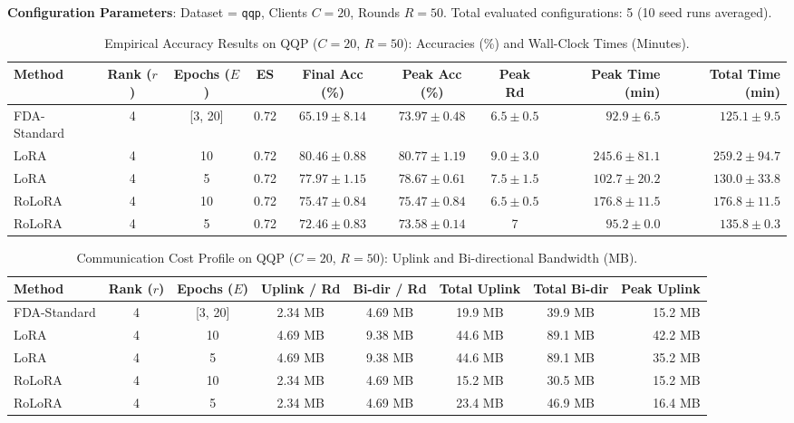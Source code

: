 \documentclass[10pt,a4paper]{article}
\begin{document}
\textbf{Configuration Parameters}: Dataset = \texttt{qqp}, Clients $C = 20$, Rounds $R = 50$. Total evaluated configurations: 5 (10 seed runs averaged).

\begin{table}[H]
\centering
\caption{Empirical Accuracy Results on QQP ($C=20$, $R=50$): Accuracies (\%) and Wall-Clock Times (Minutes).}
\scriptsize
\setlength{\tabcolsep}{3.5pt}
\begin{tabular*}{\textwidth}{@{\extracolsep{\fill}}lccccccrr@{}}
\toprule
\textbf{Method} & \textbf{Rank ($r$)} & \textbf{Epochs ($E$)} & \textbf{ES} & \textbf{Final Acc (\%)} & \textbf{Peak Acc (\%)} & \textbf{Peak Rd} & \textbf{Peak Time (min)} & \textbf{Total Time (min)} \\
\midrule
FDA-Standard & 4 & [3, 20] & 0.72 & $65.19 \pm 8.14$ & $73.97 \pm 0.48$ & $6.5 \pm 0.5$ & $\mathbf{92.9 \pm 6.5}$ & $\mathbf{125.1 \pm 9.5}$ \\
LoRA & 4 & 10 & 0.72 & $\mathbf{80.46 \pm 0.88}$ & $\mathbf{80.77 \pm 1.19}$ & $9.0 \pm 3.0$ & $245.6 \pm 81.1$ & $259.2 \pm 94.7$ \\
LoRA & 4 & 5 & 0.72 & $77.97 \pm 1.15$ & $78.67 \pm 0.61$ & $7.5 \pm 1.5$ & $102.7 \pm 20.2$ & $130.0 \pm 33.8$ \\
RoLoRA & 4 & 10 & 0.72 & $75.47 \pm 0.84$ & $75.47 \pm 0.84$ & $6.5 \pm 0.5$ & $176.8 \pm 11.5$ & $176.8 \pm 11.5$ \\
RoLoRA & 4 & 5 & 0.72 & $72.46 \pm 0.83$ & $73.58 \pm 0.14$ & 7 & $95.2 \pm 0.0$ & $135.8 \pm 0.3$ \\
\bottomrule
\end{tabular*}
\end{table}

\begin{table}[H]
\centering
\caption{Communication Cost Profile on QQP ($C=20$, $R=50$): Uplink and Bi-directional Bandwidth (MB).}
\scriptsize
\setlength{\tabcolsep}{4.0pt}
\begin{tabular*}{\textwidth}{@{\extracolsep{\fill}}lccccccr@{}}
\toprule
\textbf{Method} & \textbf{Rank ($r$)} & \textbf{Epochs ($E$)} & \textbf{Uplink / Rd} & \textbf{Bi-dir / Rd} & \textbf{Total Uplink} & \textbf{Total Bi-dir} & \textbf{Peak Uplink} \\
\midrule
FDA-Standard & 4 & [3, 20] & 2.34 MB & 4.69 MB & 19.9 MB & 39.9 MB & 15.2 MB \\
LoRA & 4 & 10 & 4.69 MB & 9.38 MB & 44.6 MB & 89.1 MB & 42.2 MB \\
LoRA & 4 & 5 & 4.69 MB & 9.38 MB & 44.6 MB & 89.1 MB & 35.2 MB \\
RoLoRA & 4 & 10 & 2.34 MB & 4.69 MB & 15.2 MB & 30.5 MB & 15.2 MB \\
RoLoRA & 4 & 5 & 2.34 MB & 4.69 MB & 23.4 MB & 46.9 MB & 16.4 MB \\
\bottomrule
\end{tabular*}
\end{table}
\end{document}
